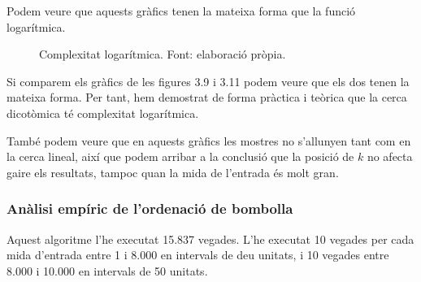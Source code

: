Podem veure que aquests gràfics tenen la mateixa forma que la funció logarítmica.

\begin{figure}[H]
    \centering
{}
    \caption[Complexitat logarítmica.]{Complexitat logarítmica. Font: elaboració pròpia.}
    \label{fig:my_label}
\end{figure}

Si comparem els gràfics de les figures 3.9 i 3.11 podem veure que els dos tenen la mateixa forma. Per tant, hem demostrat de forma pràctica i teòrica que la cerca dicotòmica té complexitat logarítmica.

També podem veure que en aquests gràfics les mostres no s'allunyen tant com en la cerca lineal, així que podem arribar a la conclusió que la posició de $k$ no afecta gaire els resultats, tampoc quan la mida de l'entrada és molt gran.

\subsubsection{Anàlisi empíric de l'ordenació de bombolla}
Aquest algoritme l'he executat 15.837 vegades. L'he executat 10 vegades per cada mida d'entrada entre 1 i 8.000 en intervals de deu unitats, i 10 vegades entre 8.000 i 10.000 en intervals de 50 unitats.

